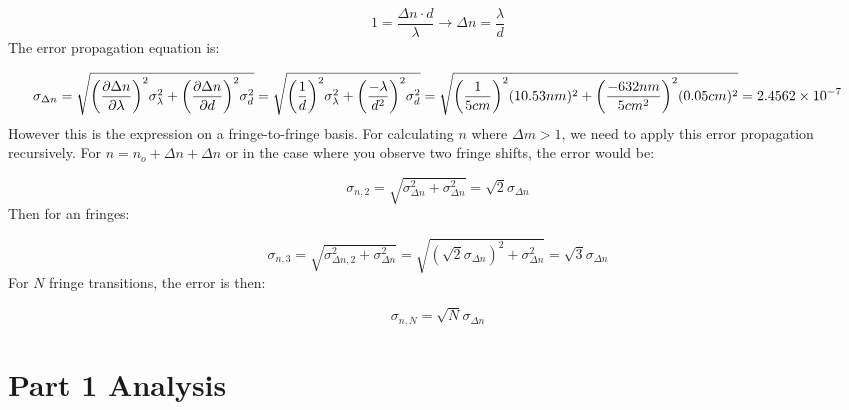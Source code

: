 \documentclass{article}
\begin{document}
\begin{equation}
	1 = \frac{\Delta{n}\cdot d}{\lambda} \rightarrow \Delta{n} = \frac{\lambda}{d}
\end{equation}The error propagation equation is:

\begin{equation}
	\sigma_{\Delta{n}} = \sqrt{ \bigg(  \frac{\partial\Delta{n}}{\partial\lambda} \bigg)^2\sigma_\lambda^2 + \bigg( \frac{\partial\Delta{n}}{\partial{d}}  \bigg)^2\sigma_d^2} = \sqrt{ \bigg(  \frac{1}{d} \bigg)^2\sigma_\lambda^2 + \bigg( \frac{-\lambda}{d^2}  \bigg)^2\sigma_d^2}
    = \sqrt{ \bigg(  \frac{1}{5cm} \bigg)^2(10.53nm)^2 + \bigg( \frac{-632nm}{5cm^2}  \bigg)^2(0.05cm)^2} = \num{2.4562d-7}
\end{equation}
However this is the expression on a fringe-to-fringe basis. For calculating $n$ where $\Delta{m} > 1$, we need to apply this error propagation recursively.
For $n = n_o + \Delta{n} + \Delta{n}$ or in the case where you observe two fringe shifts, the error would be:

\begin{equation}
	\sigma_{n,2} = \sqrt{\sigma_{\Delta{n}}^2 + \sigma_{\Delta{n}}^2} = \sqrt{2}\sigma_{\Delta{n}}
\end{equation}Then for an fringes:

\begin{equation}
	\sigma_{n,3} = \sqrt{\sigma_{\Delta{n,2}}^2 + \sigma_{\Delta{n}}^2} =\sqrt{(\sqrt{2}\sigma_{\Delta{n}})^2 + \sigma_{\Delta{n}}^2} = \sqrt{3}\sigma_{\Delta{n}}
\end{equation}For $N$ fringe transitions, the error is then:

\begin{equation}
  \sigma_{n,N} = \sqrt{N}\sigma_{\Delta{n}}
\end{equation}





\clearpage

\section{  Part 1 Analysis }\label{sec:part_1_analysis }\label{sec:_part_1_analysis_}\label{sec:part_1_analysis}












\end{document}
